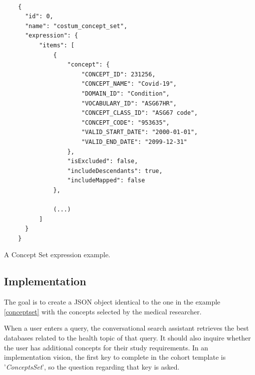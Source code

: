 \begin{listing}[H]
  \begin{verbatim}
      
    {
      "id": 0,
      "name": "costum_concept_set",
      "expression": {
          "items": [
              {
                  "concept": {
                      "CONCEPT_ID": 231256,
                      "CONCEPT_NAME": "Covid-19",
                      "DOMAIN_ID": "Condition",
                      "VOCABULARY_ID": "ASG67HR",
                      "CONCEPT_CLASS_ID": "ASG67 code",
                      "CONCEPT_CODE": "953635",
                      "VALID_START_DATE": "2000-01-01",
                      "VALID_END_DATE": "2099-12-31"
                  },
                  "isExcluded": false,
                  "includeDescendants": true,
                  "includeMapped": false
              },
              
              (...)
          ]
      }
    }

  \end{verbatim}
\caption{A Concept Set expression example.}
\label{conceptset}
\end{listing}  



\subsection{Implementation}




The goal is to create a JSON object identical to the one in the example \ref{conceptset} with the concepts selected by the medical researcher.

When a user enters a query, the conversational search assistant retrieves the best databases related to the health topic of that query. It should also inquire whether the user has additional concepts for their study requirements. In an implementation vision, the first key to complete in the cohort template is '\textit{ConceptsSet}', so the question regarding that key is asked.

